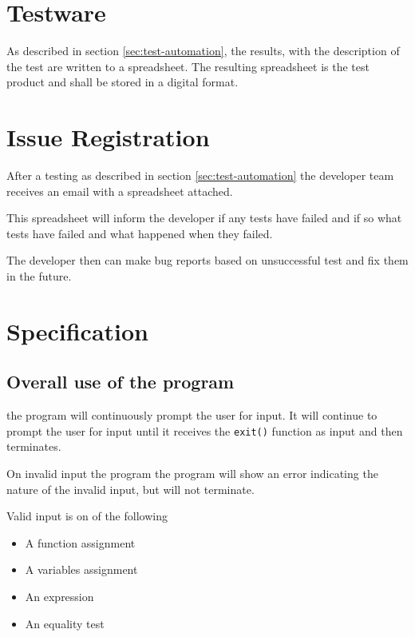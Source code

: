 \documentclass[11pt,a4paper]{article}
\begin{document}

\section{Testware}

As described in section \ref{sec:test-automation}, the results, with
the description of the test are written to a spreadsheet. The
resulting spreadsheet is the test product and shall be stored in a
digital format.


\section{Issue Registration}

After a testing as described in section \ref{sec:test-automation} the
developer team receives an email with a spreadsheet attached.

This spreadsheet will inform the developer if any tests have failed
and if so what tests have failed and what happened when they failed.

The developer then can make bug reports based on unsuccessful test and
fix them in the future.


\appendix
\section{Specification} \label{app:specification}
\subsection{Overall use of the program}
the program will continuously prompt the user for input. It will
continue to prompt the user for input until it receives the
\texttt{exit()} function as input and then terminates.

On invalid input the program the program will show an error
indicating the nature of the invalid input, but will not terminate.

Valid input is on of the following
\begin{itemize}
\item A function assignment
\item A variables assignment
\item An expression
\item An equality test
\end{itemize}
\end{document}

